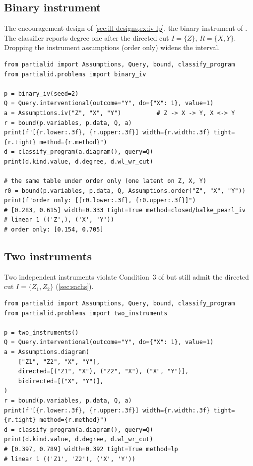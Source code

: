 \subsection{Binary instrument}
\label{app:code-iv}

The encouragement design of \cref{sec:ill-designs,ex:iv-lp}, the binary
instrument of \citet{balke1997bounds}. The classifier reports
degree one after the directed cut $I=\{Z\}$, $R=\{X,Y\}$. Dropping the
instrument assumptions (order only) widens the interval.
\begin{lstlisting}
from partialid import Assumptions, Query, bound, classify_program
from partialid.problems import binary_iv

p = binary_iv(seed=2)
Q = Query.interventional(outcome="Y", do={"X": 1}, value=1)
a = Assumptions.iv("Z", "X", "Y")          # Z -> X -> Y, X <-> Y
r = bound(p.variables, p.data, Q, a)
print(f"[{r.lower:.3f}, {r.upper:.3f}] width={r.width:.3f} tight={r.tight} method={r.method}")
d = classify_program(a.diagram(), query=Q)
print(d.kind.value, d.degree, d.wl_wr_cut)

# the same table under order only (one latent on Z, X, Y)
r0 = bound(p.variables, p.data, Q, Assumptions.order("Z", "X", "Y"))
print(f"order only: [{r0.lower:.3f}, {r0.upper:.3f}]")
# [0.283, 0.615] width=0.333 tight=True method=closed/balke_pearl_iv
# linear 1 (('Z',), ('X', 'Y'))
# order only: [0.154, 0.705]
\end{lstlisting}

\subsection{Two instruments}
\label{app:code-two-iv}

Two independent instruments violate Condition~3 of
\citet[Proposition~2]{symbolicbounds2023general} but still admit the directed
cut $I=\{Z_1,Z_2\}$ (\cref{sec:sachs}).
\begin{lstlisting}
from partialid import Assumptions, Query, bound, classify_program
from partialid.problems import two_instruments

p = two_instruments()
Q = Query.interventional(outcome="Y", do={"X": 1}, value=1)
a = Assumptions.diagram(
    ["Z1", "Z2", "X", "Y"],
    directed=[("Z1", "X"), ("Z2", "X"), ("X", "Y")],
    bidirected=[("X", "Y")],
)
r = bound(p.variables, p.data, Q, a)
print(f"[{r.lower:.3f}, {r.upper:.3f}] width={r.width:.3f} tight={r.tight} method={r.method}")
d = classify_program(a.diagram(), query=Q)
print(d.kind.value, d.degree, d.wl_wr_cut)
# [0.397, 0.789] width=0.392 tight=True method=lp
# linear 1 (('Z1', 'Z2'), ('X', 'Y'))
\end{lstlisting}


